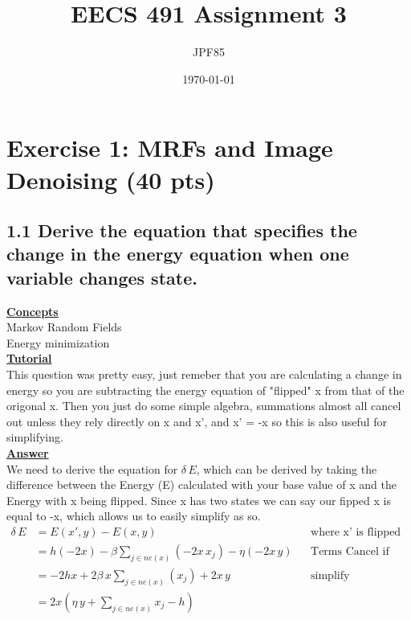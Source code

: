 \documentclass[11pt]{article}
\title{EECS 491 Assignment 3}
\author{JPF85}
\date{\today}
\begin{document}
\maketitle

\section{Exercise 1: MRFs and Image Denoising (40 pts)}

\subsection{1.1  Derive the equation that specifies the change in the energy equation when one variable changes state.}
\noindent \textbf{\underline{Concepts}}\\
Markov Random Fields\\
Energy minimization\\
\noindent \textbf{\underline{Tutorial}}\\
This question was pretty easy, just remeber that you are calculating a change in energy so you are subtracting the energy equation of "flipped" x from that of the 
 origonal x.  Then you just do some simple algebra, summations almost all cancel out unless they rely directly on x and x', and x' = -x so this is also useful for
 simplifying.\\
\noindent \textbf{\underline{Answer}} \\We need to derive the equation for $\delta\,E$, which can be derived by taking the difference between the Energy (E) calculated with your base value of x
 and the Energy with x being flipped.  Since x has two states we can say our fipped x is equal to -x, which allows us to easily simplify as so.
\begin{align*}
    \delta\,E   &= E(x',y) - E(x,y) && \text{where x' is flipped x, x' = -x}\\
                &= h(-2x) - \beta\sum_{j \in ne(x)}(-2x\,x_{j}) - \eta(-2x\,y) && \text{Terms Cancel if they do not depend on x', replace x' with -x}\\
                &= -2hx + 2\beta\,x\sum_{j \in ne(x)}(x_{j}) + 2x\,y && \text{simplify}\\
                &= 2x(\eta\,y + \sum_{j \in ne(x)}x_{j} - h)
\end{align*}
\end{document}
